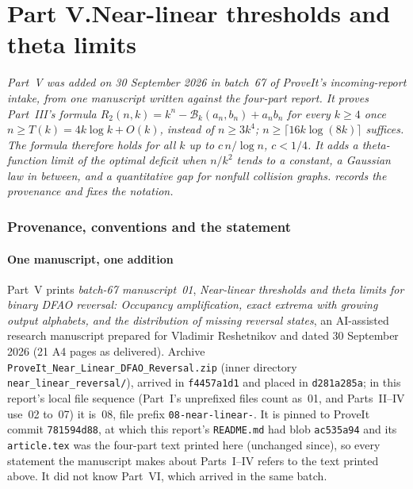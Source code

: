\documentclass[11pt,a4paper]{article}
\numberwithin{equation}{section}
\theoremstyle{definition}
\theoremstyle{remark}
\newcommand{\Bip}{\mathcal B}
\begin{document}
\clearpage
\begingroup
\renewcommand{\UrlBreaks}{\do\.\do\@\do\\\do\/\do\!\do\_\do\|\do\;\do\>\do\]\do\)\do\,\do\?\do\'\do+\do\=\do\#\do\-}
\part*{Part V.\quad Near-linear thresholds and theta limits}

\noindent\emph{Part~V was added on 30 September 2026 in batch~67 of
ProveIt's incoming-report intake, from one manuscript written against the
four-part report. It proves Part~III's formula
$R_2(n,k)=k^n-\Bip_k(a_n,b_n)+a_nb_n$ for every $k\ge4$ once
$n\ge T(k)=4k\log k+O(k)$, instead of $n\ge3k^4$; $n\ge\lceil16k\log(8k)\rceil$
suffices. The formula therefore holds for all $k$ up to $c\,n/\log n$,
$c<1/4$. It adds a theta-function limit of the optimal deficit when $n/k^2$
tends to a constant, a Gaussian law in between, and a quantitative gap for
nonfull collision graphs.  records the provenance and
fixes the notation.}

\section{Provenance, conventions and the statement}\label{nl:sec:intro}

\subsection{One manuscript, one addition}\label{nl:sec:source}

Part~V prints \emph{batch-67 manuscript~01}, \emph{Near-linear thresholds
and theta limits for binary DFAO reversal: Occupancy amplification, exact
extrema with growing output alphabets, and the distribution of missing
reversal states}, an AI-assisted research manuscript prepared for Vladimir
Reshetnikov and dated 30 September 2026 (21 A4 pages as delivered). Archive
\texttt{ProveIt\_\allowbreak Near\_\allowbreak Linear\_\allowbreak DFAO\_\allowbreak Reversal.zip}
(inner directory \texttt{near\_\allowbreak linear\_\allowbreak reversal/}),
arrived in \texttt{f4457a1d1} and placed in \texttt{d281a285a}; in this
report's local file sequence (Part~I's unprefixed files count as~01, and
Parts~II--IV use~02 to~07) it is~08, file prefix \texttt{08-near-linear-}.
It is pinned to ProveIt commit \texttt{781594d88}, at which this report's
\texttt{README.md} had blob \texttt{ac535a94} and its \texttt{article.tex}
was the four-part text printed here (unchanged since), so every statement
the manuscript makes about Parts~I--IV refers to the text printed above. It
did not know Part~VI, which arrived in the same batch.
\end{document}
